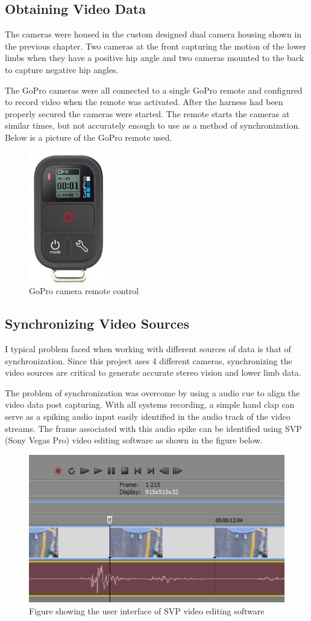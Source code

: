 \subsection{Obtaining Video Data}
The cameras were housed in the custom designed dual camera housing shown in the previous chapter. Two cameras at the front capturing the motion of the lower limbs when they have a positive hip angle and two cameras mounted to the back to capture negative hip angles.

The GoPro cameras were all connected to a single GoPro remote and configured to record video when the remote was activated. After the harness had been properly secured the cameras were started. The remote starts the cameras at similar times, but not accurately enough to use as a method of synchronization. Below is a picture of the GoPro remote used.

\begin{figure}[!ht]
\captionsetup{width=0.8\linewidth, font=small} 
\includegraphics[width=0.1\linewidth]{figures/remote.jpg}
\caption{GoPro camera remote control}
\label{fig:remote}
\end{figure}

\subsection{Synchronizing Video Sources}
I typical problem faced when working with different sources of data is that of synchronization. Since this project ases 4 different cameras, synchronizing the video sources are critical to generate accurate stereo vision and lower limb data.

The problem of synchronization was overcome by using a audio cue to align the video data post capturing. With all systems recording, a simple hand clap can serve as a spiking audio input easily identified in the audio track of the video streams. The frame associated with this audio spike can be identified using SVP (Sony Vegas Pro) video editing software as shown in the figure below. 

\begin{figure}[!ht]
\captionsetup{width=0.8\linewidth, font=small} 
\includegraphics[width=0.5\linewidth]{figures/svpframe.png}
\caption{Figure showing the user interface of SVP video editing software}
\label{fig:svpframe}
\end{figure}

